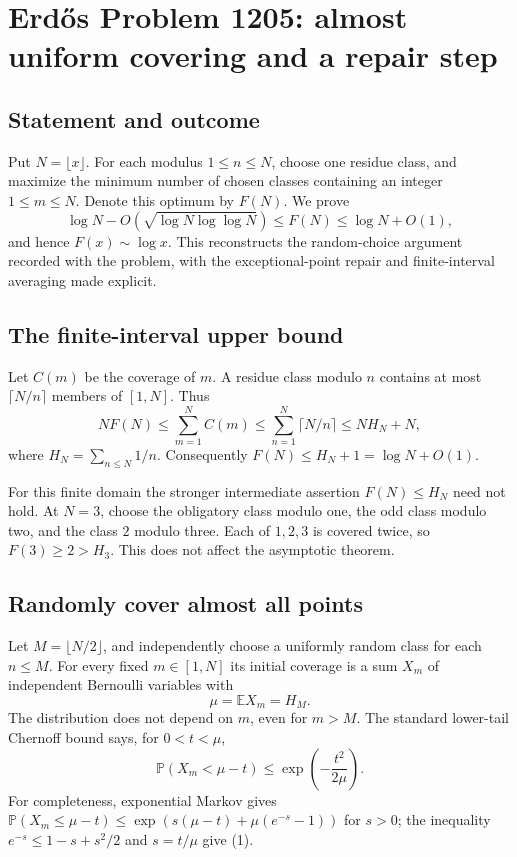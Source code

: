 \section*{Erd\H{o}s Problem 1205: almost uniform covering and a repair step}
\subsection*{Statement and outcome}
Put $N=\lfloor x\rfloor$. For each modulus $1\le n\le N$, choose one residue class, and maximize the minimum number of chosen classes containing an integer $1\le m\le N$. Denote this optimum by $F(N)$. We prove
\[
 \log N-O(\sqrt{\log N\log\log N})\le F(N)\le\log N+O(1),
\]
and hence $F(x)\sim\log x$. This reconstructs the random-choice argument recorded with the problem, with the exceptional-point repair and finite-interval averaging made explicit.

\subsection*{The finite-interval upper bound}
Let $C(m)$ be the coverage of $m$. A residue class modulo $n$ contains at most $\lceil N/n\rceil$ members of $[1,N]$. Thus
\[
 NF(N)\le\sum_{m=1}^NC(m)
 \le\sum_{n=1}^N\lceil N/n\rceil
 \le N H_N+N,
\]
where $H_N=\sum_{n\le N}1/n$. Consequently $F(N)\le H_N+1=\log N+O(1)$.

For this finite domain the stronger intermediate assertion $F(N)\le H_N$ need not hold. At $N=3$, choose the obligatory class modulo one, the odd class modulo two, and the class $2$ modulo three. Each of $1,2,3$ is covered twice, so $F(3)\ge2>H_3$. This does not affect the asymptotic theorem.

\subsection*{Randomly cover almost all points}
Let $M=\lfloor N/2\rfloor$, and independently choose a uniformly random class for each $n\le M$. For every fixed $m\in[1,N]$ its initial coverage is a sum $X_m$ of independent Bernoulli variables with
\[
 \mu=\mathbb E X_m=H_M.
\]
The distribution does not depend on $m$, even for $m>M$. The standard lower-tail Chernoff bound says, for $0<t<\mu$,
\[
 \mathbb P(X_m<\mu-t)\le\exp\left(-\frac{t^2}{2\mu}\right).
 \tag{1}
\]
For completeness, exponential Markov gives
$\mathbb P(X_m\le\mu-t)\le\exp(s(\mu-t)+\mu(e^{-s}-1))$ for $s>0$; the inequality $e^{-s}\le1-s+s^2/2$ and $s=t/\mu$ give (1).

